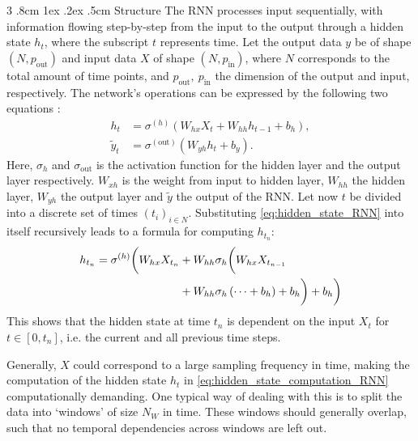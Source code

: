 \documentclass[%
reprint,
amsmath,amssymb,
aps,
]{revtex4-2}
\makeatletter
\renewcommand{\subsubsection}{%
	\@startsection
	{subsubsection}%
	{3}%
	{\z@}%
	{.8cm \@plus1ex \@minus .2ex}%
	{.5cm}%
	{\normalfont\small\centering}%
}
\makeatother
\begin{document}
\subsubsection{Structure}
The RNN processes input sequentially, with information flowing step-by-step from the input to the output through a hidden state \(h_t\), where the subscript \(t\) represents time. Let the output data \(y\) be of shape \((N, p_{\text{out}})\) and input data \(X\) of shape \((N, p_{\text{in}})\), where \(N\) corresponds to the total amount of time points, and \(p_{\text{out}}, \ p_{\text{in}}\) the dimension of the output and input, respectively. The network's operations can be expressed by the following two equations \cite{tallec2017unbiasingtruncatedbackpropagationtime}:
\begin{subequations}
\begin{align}
	h_{t} &= \sigma^{(h)}\left(W_{hx}X_{t} + W_{hh}h_{t-1}  + b_{h}\right), \label{eq:hidden_state_RNN} \\
	\tilde{y}_{t} &= \sigma^{(\text{out})}\left(W_{yh}h_{t} + b_{y}\right).	\label{eq:output_RNN}
\end{align}
\end{subequations}
Here, \(\sigma_h\) and \(\sigma_{\text{out}}\) is the activation function for the hidden layer and the output layer respectively. \(W_{xh}\) is the weight from input to hidden layer, \(W_{hh}\) the hidden layer, \(W_{yh}\) the output layer and \(\tilde{y}\) the output of the RNN. Let now \(t\) be divided into a discrete set of times \((t_i)_{i\in N}\). Substituting \eqref{eq:hidden_state_RNN} into itself recursively leads to a formula for computing \(h_{t_n}\):
\begin{align}	\label{eq:hidden_state_computation_RNN}
	h_{t_n} = \sigma^{(h)}\biggl( W_{hx}X_{t_n} &+ W_{hh}\sigma_h \biggl( W_{hx}X_{t_{n-1}} \notag\\
	&+ W_{hh}\sigma_h \left(\dots + b_h\right) + b_h\biggr) 
	+b_h\biggr)
\end{align}
This shows that the hidden state at time \(t_n\) is dependent on the input \(X_{t}\) for \(t\in[0, t_n]\), i.e. the current and all previous time steps. 

Generally, \(X\) could correspond to a large sampling frequency in time, making the computation of the hidden state \(h_t\) in \eqref{eq:hidden_state_computation_RNN} computationally demanding. One typical way of dealing with this is to split the data into `windows' of size \(N_{W}\) in time. These windows should generally overlap, such that no temporal dependencies across windows are left out. 
\end{document}
